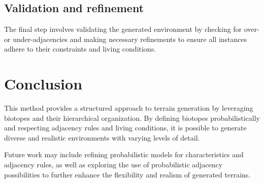\subsection{Validation and refinement}
The final step involves validating the generated environment by checking for over- or under-adjacencies and making necessary refinements to ensure all instances adhere to their constraints and living conditions.

\section{Conclusion}
\label{sec:influence-on-env-objects_conclusion}
This method provides a structured approach to terrain generation by leveraging biotopes and their hierarchical organization. By defining biotopes probabilistically and respecting adjacency rules and living conditions, it is possible to generate diverse and realistic environments with varying levels of detail.

Future work may include refining probabilistic models for characteristics and adjacency rules, as well as exploring the use of probabilistic adjacency possibilities to further enhance the flexibility and realism of generated terrains.